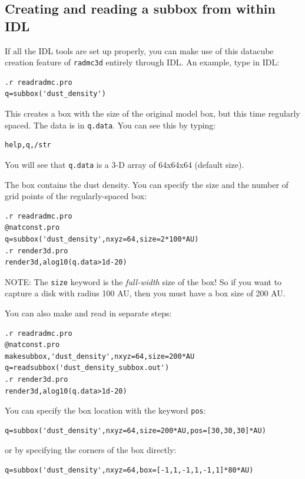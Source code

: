 \documentclass{report}
\newenvironment{asciibox}%
  {\begin{list}{}{%
    \setlength{\topsep}{0.5em}%
    \setlength{\parskip}{0em}%
    \setlength{\parsep}{0em}%
    \setlength{\itemsep}{0em}%
    \setlength{\rightmargin}{0em}%
    \setlength{\leftmargin}{3.0em}%
    \setlength{\labelsep}{1em}%
    \setlength{\labelwidth}{2em}%
  }\normalfont\footnotesize\item}
  {\end{list}}
\begin{document}
\subsection{Creating and reading a subbox from within IDL}
If all the IDL tools are set up properly, you can make use of this datacube
creation feature of {\small\tt radmc3d} entirely through IDL. An example, 
type in IDL:
\begin{asciibox}\begin{verbatim}
.r readradmc.pro
q=subbox('dust_density')
\end{verbatim}\end{asciibox}
This creates a box with the size of the original model box, but this time
regularly spaced. The data is in {\small\tt q.data}. You can see this by 
typing:
\begin{asciibox}\begin{verbatim}
help,q,/str
\end{verbatim}\end{asciibox}
You will see that {\small\tt q.data} is a 3-D array of 64x64x64 (default
size). 

The box contains the dust density. You can specify the
size and the number of grid points of the regularly-spaced box:
\begin{asciibox}\begin{verbatim}
.r readradmc.pro
@natconst.pro
q=subbox('dust_density',nxyz=64,size=2*100*AU)
.r render3d.pro
render3d,alog10(q.data>1d-20)
\end{verbatim}\end{asciibox}
NOTE: The {\small\tt size} keyword is the {\em full-width} size of the box!
So if you want to capture a disk with radius 100 AU, then you must have a
box size of 200 AU.

You can also make and read in separate steps:
\begin{asciibox}\begin{verbatim}
.r readradmc.pro
@natconst.pro
makesubbox,'dust_density',nxyz=64,size=200*AU
q=readsubbox('dust_density_subbox.out')
.r render3d.pro
render3d,alog10(q.data>1d-20)
\end{verbatim}\end{asciibox}
You can specify the box location with the keyword {\small\tt pos}:
\begin{asciibox}\begin{verbatim}
q=subbox('dust_density',nxyz=64,size=200*AU,pos=[30,30,30]*AU)
\end{verbatim}\end{asciibox}
or by specifying the corners of the box directly:
\begin{asciibox}\begin{verbatim}
q=subbox('dust_density',nxyz=64,box=[-1,1,-1,1,-1,1]*80*AU)
\end{verbatim}\end{asciibox}
\end{document}
